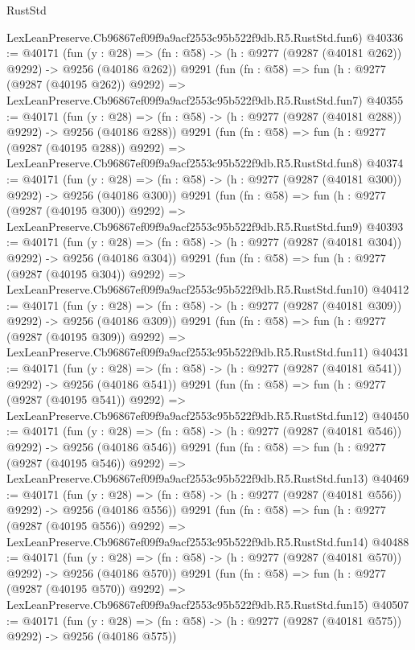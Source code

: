 \begin{lexlean}{RustStd}
\begin{coremodule}
    LexLeanPreserve.Cb96867ef09f9a9acf2553c95b522f9db.R5.RustStd.fun6)
@40336 := @40171
    (fun (y : @28) => (fn : @58) -> (h : @9277 (@9287 (@40181 @262)) @9292) -> @9256 (@40186 @262))
    @9291
    (fun (fn : @58) =>
    fun (h : @9277 (@9287 (@40195 @262)) @9292) =>
    LexLeanPreserve.Cb96867ef09f9a9acf2553c95b522f9db.R5.RustStd.fun7)
@40355 := @40171
    (fun (y : @28) => (fn : @58) -> (h : @9277 (@9287 (@40181 @288)) @9292) -> @9256 (@40186 @288))
    @9291
    (fun (fn : @58) =>
    fun (h : @9277 (@9287 (@40195 @288)) @9292) =>
    LexLeanPreserve.Cb96867ef09f9a9acf2553c95b522f9db.R5.RustStd.fun8)
@40374 := @40171
    (fun (y : @28) => (fn : @58) -> (h : @9277 (@9287 (@40181 @300)) @9292) -> @9256 (@40186 @300))
    @9291
    (fun (fn : @58) =>
    fun (h : @9277 (@9287 (@40195 @300)) @9292) =>
    LexLeanPreserve.Cb96867ef09f9a9acf2553c95b522f9db.R5.RustStd.fun9)
@40393 := @40171
    (fun (y : @28) => (fn : @58) -> (h : @9277 (@9287 (@40181 @304)) @9292) -> @9256 (@40186 @304))
    @9291
    (fun (fn : @58) =>
    fun (h : @9277 (@9287 (@40195 @304)) @9292) =>
    LexLeanPreserve.Cb96867ef09f9a9acf2553c95b522f9db.R5.RustStd.fun10)
@40412 := @40171
    (fun (y : @28) => (fn : @58) -> (h : @9277 (@9287 (@40181 @309)) @9292) -> @9256 (@40186 @309))
    @9291
    (fun (fn : @58) =>
    fun (h : @9277 (@9287 (@40195 @309)) @9292) =>
    LexLeanPreserve.Cb96867ef09f9a9acf2553c95b522f9db.R5.RustStd.fun11)
@40431 := @40171
    (fun (y : @28) => (fn : @58) -> (h : @9277 (@9287 (@40181 @541)) @9292) -> @9256 (@40186 @541))
    @9291
    (fun (fn : @58) =>
    fun (h : @9277 (@9287 (@40195 @541)) @9292) =>
    LexLeanPreserve.Cb96867ef09f9a9acf2553c95b522f9db.R5.RustStd.fun12)
@40450 := @40171
    (fun (y : @28) => (fn : @58) -> (h : @9277 (@9287 (@40181 @546)) @9292) -> @9256 (@40186 @546))
    @9291
    (fun (fn : @58) =>
    fun (h : @9277 (@9287 (@40195 @546)) @9292) =>
    LexLeanPreserve.Cb96867ef09f9a9acf2553c95b522f9db.R5.RustStd.fun13)
@40469 := @40171
    (fun (y : @28) => (fn : @58) -> (h : @9277 (@9287 (@40181 @556)) @9292) -> @9256 (@40186 @556))
    @9291
    (fun (fn : @58) =>
    fun (h : @9277 (@9287 (@40195 @556)) @9292) =>
    LexLeanPreserve.Cb96867ef09f9a9acf2553c95b522f9db.R5.RustStd.fun14)
@40488 := @40171
    (fun (y : @28) => (fn : @58) -> (h : @9277 (@9287 (@40181 @570)) @9292) -> @9256 (@40186 @570))
    @9291
    (fun (fn : @58) =>
    fun (h : @9277 (@9287 (@40195 @570)) @9292) =>
    LexLeanPreserve.Cb96867ef09f9a9acf2553c95b522f9db.R5.RustStd.fun15)
@40507 := @40171
    (fun (y : @28) => (fn : @58) -> (h : @9277 (@9287 (@40181 @575)) @9292) -> @9256 (@40186 @575))

\end{coremodule}
\end{lexlean}
